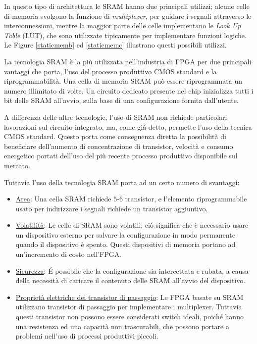 In questo tipo di architettura le SRAM hanno due principali utilizzi; alcune celle di memoria svolgono la funzione di \textit{multiplexer}, per guidare i segnali attraverso le interconnessioni, mentre la maggior parte delle celle implementano le \textit{Look Up Table} (LUT), che sono utilizzate tipicamente per implementare funzioni logiche. Le Figure \ref{staticmemb} ed \ref{staticmemc} illustrano questi possibili utilizzi.

La tecnologia SRAM è la più utilizzata nell'industria di FPGA per due principali vantaggi che porta, l'uso del processo produttivo CMOS standard e la riprogrammabilità. Una cella di memoria SRAM può essere riprogrammata un numero illimitato di volte. Un circuito dedicato presente nel chip inizializza tutti i bit delle SRAM all'avvio, sulla base di una configurazione fornita dall'utente.

A differenza delle altre tecnologie, l'uso di SRAM non richiede particolari lavorazioni sul circuito integrato, ma, come già detto, permette l'uso della tecnica CMOS standard. Questo porta come conseguenza diretta la possibilità di beneficiare dell'aumento di concentrazione di transistor, velocità e consumo energetico portati dell'uso del più recente processo produttivo disponibile sul mercato.

Tuttavia l'uso della tecnologia SRAM porta ad un certo numero di svantaggi:
\begin{itemize}
	\item \underline{Area}: Una cella SRAM richiede $5$-$6$ transistor, e l'elemento riprogrammabile usato per indirizzare i segnali richiede un transistor aggiuntivo.
	\item \underline{Volatilità}: Le celle di SRAM sono volatili; ciò significa che è necessario usare un dispositivo esterno per salvare la configurazione in modo permanente quando il dispositivo è spento. Questi dispositivi di memoria portano ad un'incremento di costo nell'FPGA.
	\item \underline{Sicurezza}: \'E possibile che la configurazione sia intercettata e rubata, a causa della necessità di caricare il contenuto delle SRAM all'avvio del dispositivo.
	\item \underline{Proprietà elettriche dei transistor di passaggio}: Le FPGA basate su SRAM utilizzano transistor di passaggio per implementare i multiplexer. Tuttavia questi transistor non possono essere considerati switch ideali, poiché hanno una resistenza ed una capacità non trascurabili, che possono portare a problemi nell'uso di processi produttivi piccoli.
\end{itemize}

